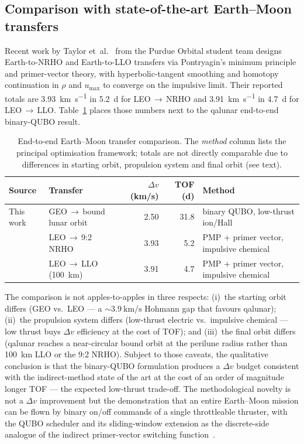 \documentclass[8pt,a4paper]{article}
\theoremstyle{definition}
\theoremstyle{remark}
\begin{document}
\subsection{Comparison with state-of-the-art Earth--Moon transfers}\label{sec:purdue-comparison}

Recent work by Taylor et~al.~\cite{Taylor2026} from the Purdue
Orbital student team designs Earth-to-NRHO and Earth-to-LLO
transfers via Pontryagin's minimum principle and primer-vector
theory, with hyperbolic-tangent smoothing and homotopy continuation
in $\rho$ and $u_\mathrm{max}$ to converge on the impulsive limit.
Their reported totals are \SI{3.93}{\km\per\second} in
\SI{5.2}{\day} for LEO\,$\to$\,NRHO and \SI{3.91}{\km\per\second}
in \SI{4.7}{\day} for LEO\,$\to$\,LLO. Table~\ref{tab:purdue-manual}
places those numbers next to the qalunar end-to-end binary-QUBO
result.

\begin{table}[htbp]
\centering
\caption{End-to-end Earth--Moon transfer comparison. The
\emph{method} column lists the principal optimisation framework;
totals are not directly comparable due to differences in starting
orbit, propulsion system and final orbit (see text).}
\label{tab:purdue-manual}
\begin{tabular}{llrrl}
\toprule
Source & Transfer & $\Delta v$ (km/s) & TOF (d) & Method \\
\midrule
This work
  & GEO\,$\to$\,bound lunar orbit
  & \num{2.50} & \num{31.8}
  & binary QUBO, low-thrust ion/Hall \\
\cite{Taylor2026}
  & LEO\,$\to$\,9{:}2 NRHO
  & \num{3.93} & \num{5.2}
  & PMP + primer vector, impulsive chemical \\
\cite{Taylor2026}
  & LEO\,$\to$\,LLO (\SI{100}{\km})
  & \num{3.91} & \num{4.7}
  & PMP + primer vector, impulsive chemical \\
\bottomrule
\end{tabular}
\end{table}

The comparison is not apples-to-apples in three respects:
(i)~the starting orbit differs (GEO vs.\ LEO --- a
$\sim\SI{3.9}{\km\per\second}$ Hohmann gap that favours qalunar);
(ii)~the propulsion system differs (low-thrust electric vs.\
impulsive chemical --- low thrust buys $\Delta v$ efficiency at
the cost of TOF); and (iii)~the final orbit differs (qalunar
reaches a near-circular bound orbit at the perilune radius rather
than \SI{100}{\km} LLO or the 9{:}2 NRHO). Subject to those
caveats, the qualitative conclusion is that the binary-QUBO
formulation produces a $\Delta v$ budget consistent with the
indirect-method state of the art at the cost of an order of
magnitude longer TOF --- the expected low-thrust trade-off. The
methodological novelty is not a $\Delta v$ improvement but the
demonstration that an entire Earth--Moon mission can be flown by
binary on/off commands of a single throttleable thruster, with
the QUBO scheduler and its sliding-window extension as the
discrete-side analogue of the indirect primer-vector switching
function~\cite{Taylor2026}.
\end{document}
